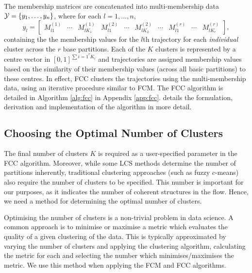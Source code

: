 \documentclass[a4paper, fontsize=12pt]{article}
\begin{document}
The membership matrices are concatenated into multi-membership data \(\mathcal{Y} = \set{y_1, \hdots, y_n}\), where for each \(l = 1,\hdots,n\),
\[
y_l = \begin{bmatrix}
	M^{(1)}_{l1} & \cdots & M^{(1)}_{lK_1} & M^{(2)}_{l1} & \cdots & M^{(2)}_{lK_2} & \cdots & M^{(r)}_{l1} & \cdots & M^{(r)}_{lK_r}
\end{bmatrix},
\]
containing the the membership values for the \(l\)th trajectory for each \textit{individual} cluster across the \(r\) base partitions. Each of the \(K\) clusters is represented by a centre vector in \([0,1]^{\sum{i=1}^r{K_i}}\) and trajectories are assigned membership values based on the similarity of their membership values (across all basic partitions) to these centres. In effect, FCC clusters the trajectories using the multi-membership data, using an iterative procedure similar to FCM. The FCC algorithm is detailed in Algorithm \ref{alg:fcc} in Appendix \ref{app:fcc}. \cite{wu_2017_fcc} details the formulation, derivation and implementation of the algorithm in more detail.%






\subsection{Choosing the Optimal Number of Clusters}
The final number of clusters \(K\) is required as a user-specified parameter in the FCC algorithm. Moreover, while some LCS methods determine the number of partitions inherently, traditional clustering approaches (such as fuzzy \(c\)-means) also require the number of clusters to be specified. This number is important for our purposes, as it indicates the number of coherent structures in the flow. Hence, we need a method for determining the optimal number of clusters.

Optimising the number of clusters is a non-trivial problem in data science. A common approach is to minimise or maximise a metric which evaluates the quality of a given clustering of the data. This is typically approximated by varying the number of clusters and applying the clustering algorithm, calculating the metric for each and selecting the number which minimises/maximises the metric. We use this method when applying the FCM and FCC algorithms.
\end{document}
